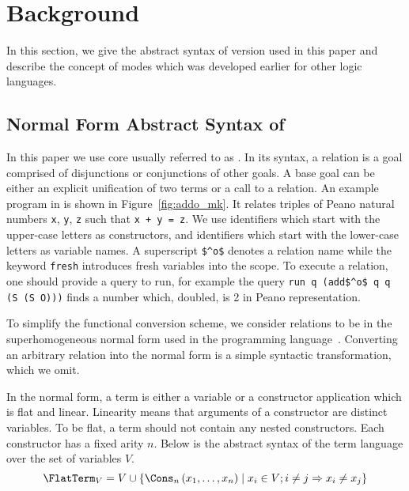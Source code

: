 \section{Background}

In this section, we give the abstract syntax of \mk version used in this paper and describe the concept of modes which was developed earlier for other logic languages.

\subsection{Normal Form Abstract Syntax of \mk}

In this paper we use core \mk usually referred to as \micro.
In its syntax, a relation is a goal comprised of disjunctions or conjunctions of other goals.
A base goal can be either an explicit unification of two terms or a call to a relation.
An example program in \mk is shown in Figure~\ref{fig:addo_mk}.
It relates triples of Peano natural numbers \lstinline{x}, \lstinline{y}, \lstinline{z} such that \lstinline{x + y = z}.
We use identifiers which start with the upper-case letters as constructors, and identifiers which start with the lower-case letters as variable names.
A superscript \lstinline{$^o$} denotes a relation name while the keyword \lstinline{fresh} introduces fresh variables into the scope.
To execute a relation, one should provide a query to run, for example the query \lstinline{run q (add$^o$ q q (S (S O)))} finds a number which, doubled, is 2 in Peano representation.





To simplify the functional conversion scheme, we consider \mk relations to be in the superhomogeneous normal form used in the \merc programming language~\cite{somogyi1996execution}.
Converting an arbitrary \mk relation into the normal form is a simple syntactic transformation, which we omit.

In the normal form, a term is either a variable or a constructor application which is flat and linear.
Linearity means that arguments of a constructor are distinct variables.
To be flat, a term should not contain any nested constructors.
Each constructor has a fixed arity $n$.
Below is the abstract syntax of the term language over the set of variables $V$.
\[  \FlatTerm_{V} = V \cup \{\Cons_{n}\left( x_1, \ldots, x_{n} \right) \mid x_{i}\in V; i \neq j \Rightarrow x_i \neq x_j\} \]


